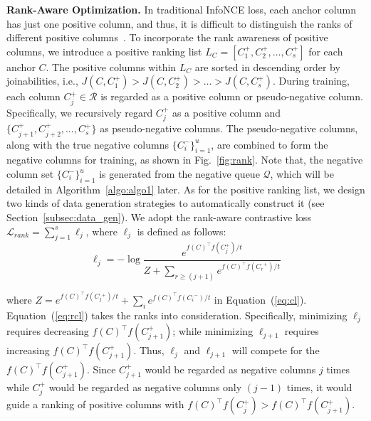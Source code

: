 \noindent \textbf{Rank-Aware Optimization.}
In traditional InfoNCE loss, each anchor column has just one positive column, and thus, it is difficult to distinguish the ranks of different positive columns~\cite{rank}. To incorporate the rank awareness of positive
columns, we introduce a positive ranking list $L_C = [C_1^+, C_2^+, \dots, C_s^+]$ for each anchor $C$. The positive columns within $L_C$ are sorted in descending order by joinabilities, i.e., $J(C, C_1^+) > J(C, C_2^+) > \dots > J(C, C_s^+)$. During training, each column $C_j^+ \in \mathcal{R}$ is regarded as a positive column or pseudo-negative column. Specifically, we recursively regard $C_j^+$ as a positive column and $\{C_{j+1}^+, C_{j+2}^+, \dots, C_s^+\}$ as pseudo-negative columns.
The pseudo-negative columns, along with the true negative columns $\{C_i^-\}_{i=1}^u$, are combined to form the negative columns for training, as shown in Fig.~\ref{fig:rank}.
Note that, the negative column set $\{C_i^-\}_{i=1}^u$ is generated from the negative queue $\mathcal{Q}$, which will be detailed  in Algorithm~\ref{algo:algo1} later.
As for the positive ranking list, we design two kinds of data generation strategies to automatically construct it (see Section~\ref{subsec:data_gen}).
We adopt the rank-aware contrastive loss~\cite{rank} $\mathcal{L}_{rank} = \sum_{j=1} ^ s \ell_j$, where $\ell_j$ is defined as follows:
\begin{equation}
\label{eq:rcl}
\ell_j =- \log \frac{e^{  f(C)^{\top}f(C_j^+)/ t}}{{ Z+\sum \limits_{r \geq (j+1)} e^{  f({C})^{\top} f({C_r}^+)/ t}}  }
\end{equation} 


\noindent where $Z = { e^{ f(C)^{\top} f({C}{_j}^+)/ t} + {\sum_i e^{  f({C})^{\top} f({C_i}^-)/ t}}}$ in Equation~(\ref{eq:cl}). Equation~(\ref{eq:rcl}) takes the ranks into consideration. Specifically, minimizing $\ell_j$ requires
decreasing $f(C)^{\top} f(C_{j+1}^+)$; while minimizing $\ell_{j+1}$ requires increasing $f(C)^{\top} f(C_{j+1}^+)$. Thus, $\ell_j$ and $\ell_{j+1}$ will compete for the  $f(C)^{\top} f(C_{j+1}^+)$. Since $C_{j+1}^+$ would be regarded as negative columns $j$ times while $C_j^+$ would be regarded as negative columns only $(j-1)$ times,  it would guide a ranking of positive columns with $f(C)^{\top} f(C_j^+) > f(C)^{\top} f(C_{j+1}^+)$.




